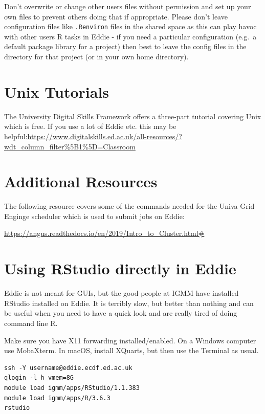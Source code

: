 \documentclass[
]{book}
\begin{document}
Don't overwrite or change other users files without permission and set up your own files to prevent others doing that if appropriate. Please don't leave configuration files like \texttt{.Renviron} files in the shared space as this can play havoc with other users R tasks in Eddie - if you need a particular configuration (e.g.~a default package library for a project) then best to leave the config files in the directory for that project (or in your own home directory).

\hypertarget{unix-tutorials}{%
\section{Unix Tutorials}\label{unix-tutorials}}

The University Digital Skills Framework offers a three-part tutorial covering Unix which is free. If you use a lot of Eddie etc. this may be helpful:\url{https://www.digitalskills.ed.ac.uk/all-resources/?wdt_column_filter\%5B1\%5D=Classroom}

\hypertarget{additional-resources}{%
\section{Additional Resources}\label{additional-resources}}

The following resource covers some of the commands needed for the Univa Grid Enginge scheduler which is used to submit jobs on Eddie:

\url{https://angus.readthedocs.io/en/2019/Intro_to_Cluster.html\#}

\hypertarget{using-rstudio-directly-in-eddie}{%
\section{Using RStudio directly in Eddie}\label{using-rstudio-directly-in-eddie}}

Eddie is not meant for GUIs, but the good people at IGMM have installed RStudio installed on Eddie. It is terribly slow, but better than nothing and can be useful when you need to have a quick look and are really tired of doing command line R.

Make sure you have X11 forwarding installed/enabled. On a Windows computer use MobaXterm. In macOS, install XQuarts, but then use the Terminal as usual.

\begin{verbatim}
ssh -Y username@eddie.ecdf.ed.ac.uk
qlogin -l h_vmem=8G
module load igmm/apps/RStudio/1.1.383
module load igmm/apps/R/3.6.3
rstudio
\end{verbatim}
\end{document}
